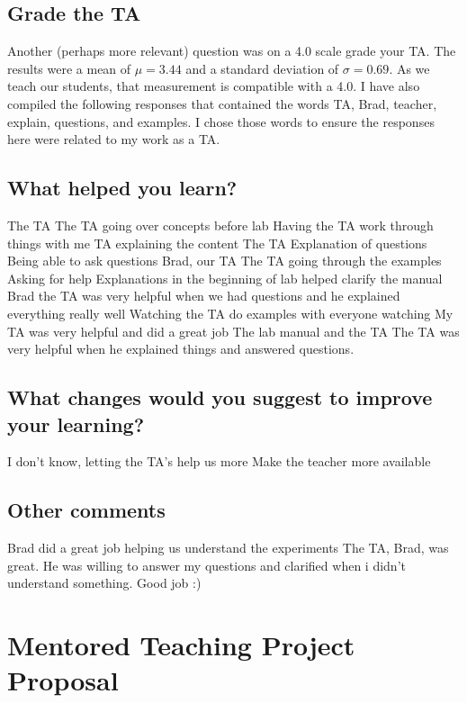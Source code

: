 \documentclass{article}
\begin{document}
\subsection{Grade the TA}
\hspace{0.5cm}Another (perhaps more relevant) question was on a 4.0 scale grade your TA. The results were a mean of $\mu=3.44$ and a standard deviation of $\sigma=0.69$. As we teach our students, that measurement is compatible with a 4.0. 
\newpage
I have also compiled the following responses that contained the words TA, Brad, teacher, explain, questions, and examples. I chose those words to ensure the responses here were related to my work as a TA. 
\subsection{What helped you learn?}
\hspace{0.5cm}The TA
The TA going over concepts before lab
Having the TA work through things with me
TA explaining the content
The TA
Explanation of questions
Being able to ask questions
Brad, our TA
The TA going through the examples
Asking for help
Explanations in the beginning of lab helped clarify the manual
Brad the TA was very helpful when we had questions and he explained everything really well
Watching the TA do examples with everyone watching
My TA was very helpful and did a great job
The lab manual and the TA
The TA was very helpful when he explained things and answered questions. 
\subsection{What changes would you suggest to improve your learning?}
\hspace{0.5cm}I don't know, letting the TA's help us more
Make the teacher more available
\subsection{Other comments}
\hspace{0.5cm}Brad did a great job helping us understand the experiments
The TA, Brad, was great. He was willing to answer my questions and clarified when i didn't understand something.
Good job :)
\newpage


\section{Mentored Teaching Project Proposal}
\end{document}

